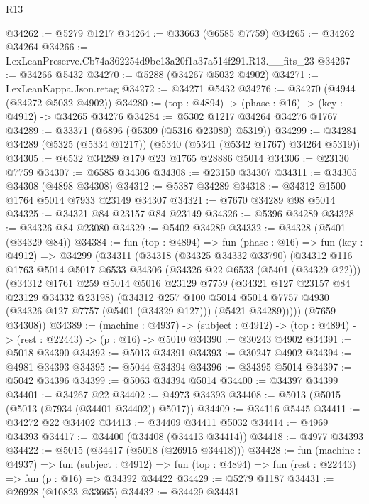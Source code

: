 \begin{lexlean}{R13}
\begin{coremodule}
@34262 := @5279 @1217
@34264 := @33663 (@6585 @7759)
@34265 := @34262 @34264
@34266 := LexLeanPreserve.Cb74a362254d9be13a20f1a37a514f291.R13.__fits_23
@34267 := @34266 @5432
@34270 := @5288 (@34267 @5032 @4902)
@34271 := LexLeanKappa.Json.retag
@34272 := @34271 @5432
@34276 := @34270 (@4944 (@34272 @5032 @4902))
@34280 := (top : @4894) -> (phase : @16) -> (key : @4912) -> @34265 @34276
@34284 := @5302 @1217 @34264 @34276 @1767
@34289 := @33371 (@6896 (@5309 (@5316 @23080) @5319))
@34299 := @34284 @34289 (@5325 (@5334 @1217)) (@5340 (@5341 (@5342 @1767) @34264 @5319))
@34305 := @6532 @34289 @179 @23 @1765 @28886 @5014
@34306 := @23130 @7759
@34307 := @6585 @34306
@34308 := @23150 @34307
@34311 := @34305 @34308 (@4898 @34308)
@34312 := @5387 @34289
@34318 := @34312 @1500 @1764 @5014 @7933 @23149 @34307
@34321 := @7670 @34289 @98 @5014
@34325 := @34321 @84 @23157 @84 @23149
@34326 := @5396 @34289
@34328 := @34326 @84 @23080
@34329 := @5402 @34289
@34332 := @34328 (@5401 (@34329 @84))
@34384 := fun (top : @4894) =>
  fun (phase : @16) =>
  fun (key : @4912) =>
  @34299
    (@34311
      (@34318
        (@34325 @34332 @33790)
        (@34312
          @116
          @1763
          @5014
          @5017
          @6533
          @34306
          (@34326 @22 @6533 (@5401 (@34329 @22)))
          (@34312
            @1761
            @259
            @5014
            @5016
            @23129
            @7759
            (@34321 @127 @23157 @84 @23129 @34332 @23198)
            (@34312
              @257
              @100
              @5014
              @5014
              @7757
              @4930
              (@34326 @127 @7757 (@5401 (@34329 @127)))
              (@5421 @34289)))))
      (@7659 @34308))
@34389 := (machine : @4937) ->
  (subject : @4912) -> (top : @4894) -> (rest : @22443) -> (p : @16) -> @5010
@34390 := @30243 @4902
@34391 := @5018 @34390
@34392 := @5013 @34391
@34393 := @30247 @4902
@34394 := @4981 @34393
@34395 := @5044 @34394
@34396 := @34395 @5014
@34397 := @5042 @34396
@34399 := @5063 @34394 @5014
@34400 := @34397 @34399
@34401 := @34267 @22
@34402 := @4973 @34393
@34408 := @5013 (@5015 (@5013 (@7934 (@34401 @34402)) @5017))
@34409 := @34116 @5445
@34411 := @34272 @22 @34402
@34413 := @34409 @34411 @5032
@34414 := @4969 @34393
@34417 := @34400 (@34408 (@34413 @34414))
@34418 := @4977 @34393
@34422 := @5015 (@34417 (@5018 (@26915 @34418)))
@34428 := fun (machine : @4937) =>
  fun (subject : @4912) =>
  fun (top : @4894) => fun (rest : @22443) => fun (p : @16) => @34392 @34422
@34429 := @5279 @1187
@34431 := @26928 (@10823 @33665)
@34432 := @34429 @34431

\end{coremodule}
\end{lexlean}
